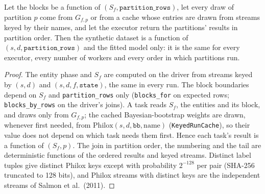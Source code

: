 \setcounter{proposition}{949}
\begin{proposition}\label{prop:rtdet}
Let the blocks be a function of $(S_f, \texttt{partition\_rows})$, let every draw of partition $p$ come from $G_{f,p}$ or from a cache whose entries are drawn from streams keyed by their names, and let the executor return the partitions' results in partition order. Then the synthetic dataset is a function of $(s, d, \texttt{partition\_rows})$ and the fitted model only: it is the same for every executor, every number of workers and every order in which partitions run.
\end{proposition}
\begin{proof}
The entity phase and $S_f$ are computed on the driver from streams keyed by $(s,d)$ and $(s,d,f,\texttt{state})$, the same in every run. The block boundaries depend on $S_f$ and \texttt{partition\_rows} only (\texttt{blocks\_for} on expected rows; \texttt{blocks\_by\_rows} on the driver's joins). A task reads $S_f$, the entities and its block, and draws only from $G_{f,p}$; the cached Bayesian-bootstrap weights are drawn, whenever first needed, from $\mathrm{Philox}(s,d,\texttt{bb},\text{name})$ (\texttt{KeyedRunCache}), so their value does not depend on which task needs them first. Hence each task's result is a function of $(S_f, p)$. The join in partition order, the numbering and the tail are deterministic functions of the ordered results and keyed streams. Distinct label tuples give distinct Philox keys except with probability $2^{-128}$ per pair (SHA-256 truncated to 128 bits), and Philox streams with distinct keys are the independent streams of Salmon et al.\ (2011).
\end{proof}

